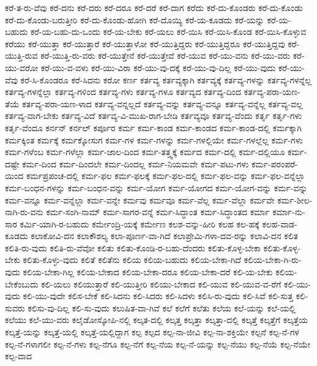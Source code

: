 {ಕರೆ-ತ-ರು-ವೆವು
ಕರೆ-ದನು
ಕರೆ-ದರು
ಕರೆ-ದರೂ
ಕರೆ-ದರೆ
ಕರೆ-ದಾಗ
ಕರೆದು
ಕರೆ-ದು-ಕೊಂಡರು
ಕರೆ-ದು-ಕೊಂಡು
ಕರೆ-ದು-ಕೊಂಡು-ಬರುತ್ತೀರಿ
ಕರೆ-ದು-ಕೊಂಡು-ಹೋಗಿ
ಕರೆ-ದೊಯ್ಯಿ
ಕರೆ-ಯ-ಕೂಡದು
ಕರೆ-ಯನ್ನು
ಕರೆ-ಯ-ಬಹುದು
ಕರೆ-ಯ-ಬಹು-ದು-ಒಂದು
ಕರೆ-ಯ-ಬೇಕು
ಕರೆ-ಯಲು
ಕರೆ-ಯಿಸಿ
ಕರೆ-ಯಿಸಿ-ಕೊಂಡ
ಕರೆ-ಯಿಸಿ-ಕೊಳ್ಳುವ
ಕರೆಯು
ಕರೆ-ಯುತ್ತಾ
ಕರೆ-ಯುತ್ತಾರೆ
ಕರೆ-ಯುತ್ತಾಳೋ
ಕರೆ-ಯುತ್ತಿದ್ದರು
ಕರೆ-ಯುತ್ತಿದ್ದರೂ
ಕರೆ-ಯುತ್ತಿದ್ದವು
ಕರೆ-ಯುತ್ತಿ-ರುವ
ಕರೆ-ಯುತ್ತಿ-ರು-ವರು
ಕರೆ-ಯುತ್ತೇನೆ
ಕರೆ-ಯುತ್ತೇವೆ
ಕರೆ-ಯುವ
ಕರೆ-ಯು-ವನು
ಕರೆ-ಯು-ವರು
ಕರೆ-ಯು-ವರೋ
ಕರೆ-ಯು-ವ-ವಳು
ಕರೆ-ಯು-ವಿರಾ
ಕರೆ-ಯು-ವು-ದಕ್ಕೆ
ಕರೆ-ಯು-ವು-ದಿಲ್ಲ
ಕರೆ-ಯು-ವುದು
ಕರೆ-ಯು-ವೆವು
ಕರೆ-ಸಿ-ಕೊಂಡರೂ
ಕರೆ-ಸಿದನು
ಕರೋ
ಕರ್ಣ
ಕರ್ತವ್ಯ
ಕರ್ತವ್ಯಕ್ಕಾಗಿ
ಕರ್ತವ್ಯಕ್ಕೆ
ಕರ್ತವ್ಯ-ಗಳನ್ನು
ಕರ್ತವ್ಯ-ಗಳನ್ನೆಲ್ಲ
ಕರ್ತವ್ಯ-ಗಳನ್ನೆಲ್ಲಾ
ಕರ್ತವ್ಯ-ಗಳಿಂದ
ಕರ್ತವ್ಯ-ಗಳು
ಕರ್ತವ್ಯ-ಗಳೂ
ಕರ್ತವ್ಯದ
ಕರ್ತವ್ಯ-ದಿಂದ
ಕರ್ತವ್ಯ-ಪರಾ-ಯಣ-ತೆಯೆ
ಕರ್ತವ್ಯ-ಪರಾ-ಯಣ-ಳಾದ
ಕರ್ತವ್ಯ-ವನ್ನಲ್ಲದೆ
ಕರ್ತವ್ಯ-ವನ್ನು
ಕರ್ತವ್ಯ-ವನ್ನೂ
ಕರ್ತವ್ಯ-ವನ್ನೆಲ್ಲ
ಕರ್ತವ್ಯ-ವಲ್ಲ
ಕರ್ತವ್ಯ-ವಾಗ-ಬೇಕು
ಕರ್ತವ್ಯ-ವಿದೆ
ಕರ್ತವ್ಯ-ವಿ-ಮುಖ-ರಾಗ-ಬೇಡಿ
ಕರ್ತವ್ಯವೂ
ಕರ್ತವ್ಯ-ವೆಂದು
ಕರ್ತೃ
ಕರ್ತೃ-ಗಳು
ಕರ್ತೃ-ವೆಂದೂ
ಕರ್ನನ್
ಕರ್ನಲ್
ಕರ್ಪೂರ
ಕರ್ಮ
ಕರ್ಮ-ಕಾಂಡ
ಕರ್ಮ-ಕಾಂಡದ
ಕರ್ಮ-ಕಾಂಡ-ದಲ್ಲಿ
ಕರ್ಮಕ್ಕಾಗಿ
ಕರ್ಮಕ್ಕಿಂತ
ಕರ್ಮಕ್ಕೆ
ಕರ್ಮಕ್ಕೋಸುಗ
ಕರ್ಮ-ಗಳ
ಕರ್ಮ-ಗಳನ್ನು
ಕರ್ಮ-ಗಳಲ್ಲಿಯೇ
ಕರ್ಮ-ಗಳಲ್ಲೆಲ್ಲ
ಕರ್ಮ-ಗಳು
ಕರ್ಮ-ಗಳೆಂಬ
ಕರ್ಮ-ಗಳೆಲ್ಲಾ
ಕರ್ಮ-ಜಾಲ-ದಿಂದ
ಕರ್ಮ-ತತ್ತ್ವಕ್ಕೆ
ಕರ್ಮದ
ಕರ್ಮ-ದಲ್ಲಿ
ಕರ್ಮ-ದಲ್ಲಿಯೂ
ಕರ್ಮ-ದಷ್ಟೇ
ಕರ್ಮ-ದಿಂದ
ಕರ್ಮ-ದಿಂದಲೇ
ಕರ್ಮ-ದಿಂದಲ್ಲ
ಕರ್ಮ-ನಿಯಮವೇ
ಕರ್ಮ-ಪಟು-ಗಳು
ಕರ್ಮ-ಪರಂಪರೆ-ಯಿಂದ
ಕರ್ಮಪ್ರಪಂಚ-ದಲ್ಲಿ
ಕರ್ಮ-ಫಲ
ಕರ್ಮ-ಫಲಕ್ಕೆ
ಕರ್ಮ-ಫಲ-ದಲ್ಲಿ
ಕರ್ಮ-ಫಲ-ವನ್ನು
ಕರ್ಮ-ಫಲ-ವನ್ನೆಲ್ಲಾ
ಕರ್ಮ-ಬಂಧನ-ಗಳನ್ನು
ಕರ್ಮ-ಬಂಧನ-ವನ್ನು
ಕರ್ಮ-ಯೋಗ
ಕರ್ಮ-ಯೋಗದ
ಕರ್ಮ-ಯೋಗ-ವನ್ನು
ಕರ್ಮ-ವನ್ನು
ಕರ್ಮ-ವನ್ನೂ
ಕರ್ಮ-ವನ್ನೆಲ್ಲಾ
ಕರ್ಮ-ವನ್ನೇ
ಕರ್ಮವು
ಕರ್ಮವೂ
ಕರ್ಮ-ವೆಲ್ಲ
ಕರ್ಮ-ವೆಲ್ಲಾ
ಕರ್ಮವೇ
ಕರ್ಮ-ಶೀಲ-ನಾಗಿ-ರು-ವನು
ಕರ್ಮ-ಸಂಗಿ-ನಾಮ್
ಕರ್ಮ-ಸಾಗರ-ವನ್ನೆ
ಕರ್ಮ-ಸಿದ್ಧಾಂತ
ಕರ್ಮ-ಸಿದ್ಧಾಂತದ
ಕರ್ಮಾ
ಕರ್ಮಾ-ನು-ಸಾರ
ಕರ್ಮಿ-ಯಾಗಿ-ರ-ಬಹುದು
ಕರ್ಮೇಂದ್ರಿ-ಯಕ್ಕೆ
ಕರ್ಮೇಣ
ಕಲಶ-ವನ್ನು-ಹೀರಿ
ಕಲಹ
ಕಲ-ಹಕ್ಕೆ
ಕಲಹ-ವಾಡ-ಕೂಡದು
ಕಲಾಕೋವಿ-ದನ
ಕಲಾಕೌಶಲ್ಯ
ಕಲಾ-ಪೂರ್ಣ-ವಾ-ಗಿದೆ
ಕಲಾಪ್ರೇಮಿ-ಗಳಾ-ದವ-ರನ್ನು
ಕಲಾವಿ-ದನ
ಕಲಿತ
ಕಲಿತಿ-ರು-ವುದು
ಕಲಿತಿ-ರು-ವೆವೋ
ಕಲಿತು
ಕಲಿತು-ಕೊಂಡಿ-ರ-ಬಹು-ದೆಂದರು
ಕಲಿತು-ಕೊಳ್ಳ-ಬೇಕಾ
ಕಲಿತು-ಕೊಳ್ಳ-ಬೇಕು
ಕಲಿತು-ಕೊಳ್ಳು-ವುದು
ಕಲಿತೆ
ಕಲಿತೆನು
ಕಲಿಯ
ಕಲಿಯ-ಬಹುದು
ಕಲಿಯ-ಬೇಕಾ-ಗಿದೆ
ಕಲಿಯ-ಬೇಕಾ-ಗಿ-ರು-ವುದು
ಕಲಿಯ-ಬೇಕಾ-ಗಿಲ್ಲ
ಕಲಿಯ-ಬೇಕಾದ
ಕಲಿಯ-ಬೇಕಾ-ದರೂ
ಕಲಿಯ-ಬೇಕಾ-ದರೆ
ಕಲಿ-ಯ-ಬೇಕು
ಕಲಿಯ-ಬೇಕೆಂಬುದು
ಕಲಿ-ಯಲು
ಕಲಿಯುತ್ತಾರೆ
ಕಲಿ-ಯುತ್ತೀರಿ
ಕಲಿಯು-ಬೇಕಾದ
ಕಲಿ-ಯುವ
ಕಲಿ-ಯುವ-ವ-ರೆಗೆ
ಕಲಿ-ಯು-ವುದು
ಕಲಿ-ಯು-ವುದೇ
ಕಲಿಸ-ಬೇಕೆ
ಕಲಿ-ಸಿದನು
ಕಲಿ-ಸಿದರು
ಕಲಿ-ಸಿದಳು
ಕಲಿಸಿ-ರು-ವುದು
ಕಲಿ-ಸಿವೆ
ಕಲಿ-ಸುತ್ತ
ಕಲಿ-ಸುವರು
ಕಲಿಸು-ವು-ದಿಲ್ಲ
ಕಲಿ-ಸು-ವುದು
ಕಲುಷಿತ-ವಾ-ಗಿವೆ
ಕಲೆ
ಕಲೆಗೆ
ಕಲೆತು
ಕಲೆಯ
ಕಲೆ-ಯನ್ನು
ಕಲೆ-ಯಲ್ಲಿ
ಕಲೆಯು
ಕಲೆ-ಯು-ವರು
ಕಲೈಡೋಸ್ಕೋಪಿ-ನಲ್ಲಿ
ಕಲ್ಕತ-ದಲ್ಲಿ
ಕಲ್ಕತ್ತ
ಕಲ್ಕತ್ತಾ
ಕಲ್ಕತ್ತಾ-ದಲ್ಲಿ
ಕಲ್ಕತ್ತೆ
ಕಲ್ಕತ್ತೆಗೆ
ಕಲ್ಕತ್ತೆಯ
ಕಲ್ಕತ್ತೆ-ಯನ್ನು
ಕಲ್ಕತ್ತೆ-ಯಲ್ಲಿ
ಕಲ್ಕತ್ತೆ-ಯಲ್ಲಿದ್ದಾಗ
ಕಲ್ಪ
ಕಲ್ಪದ
ಕಲ್ಪ-ನಾ-ಜೀವಿ
ಕಲ್ಪ-ನಾ-ಶಕ್ತಿಯೇ
ಕಲ್ಪನೆ
ಕಲ್ಪ-ನೆ-ಗಳ
ಕಲ್ಪ-ನೆ-ಗಳಾಗಲೀ
ಕಲ್ಪ-ನೆ-ಗಳು
ಕಲ್ಪ-ನೆಗೂ
ಕಲ್ಪ-ನೆಗೆ
ಕಲ್ಪ-ನೆಯ
ಕಲ್ಪ-ನೆ-ಯನ್ನು
ಕಲ್ಪ-ನೆಯು
ಕಲ್ಪ-ನೆಯೆ
ಕಲ್ಪ-ನೆಯೇ
ಕಲ್ಪ-ವಾದ
}
